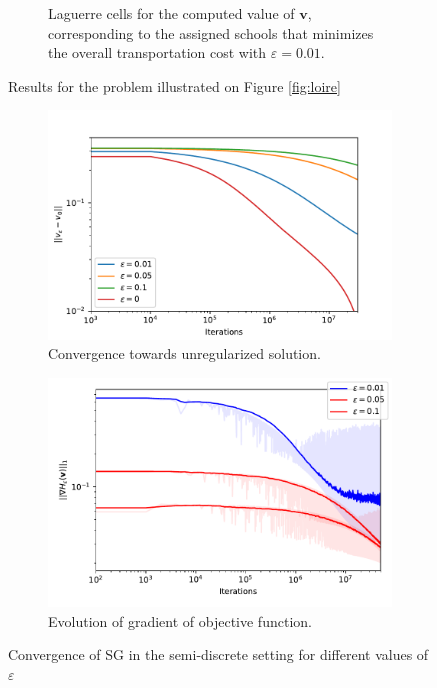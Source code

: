 \begin{figure}[h]
\begin{subfigure}{.49\linewidth}
        \caption{Laguerre cells for the computed value of $\bm{v}$, corresponding to the assigned schools that minimizes the overall transportation cost with $\varepsilon = 0.01$.}
        \label{fig:loire-cells}
    \end{subfigure}
    \caption{Results for the problem illustrated on Figure \ref{fig:loire}}
\end{figure}


\begin{figure}[h]
    \centering
    \begin{subfigure}{.49\linewidth}
        \centering
        \includegraphics[width=\linewidth]{figures/semi_discrete_eps.pdf}
        \caption{Convergence towards unregularized solution.}
        \label{fig:eps-conv-semi-dis}
    \end{subfigure}
    \begin{subfigure}{.49\linewidth}
        \centering
        \includegraphics[width=\linewidth]{figures/grad_semi_discrete.pdf}
        \caption{Evolution of gradient of objective function.}
        \label{fig:eps-grad-semi-dis}
    \end{subfigure}
    \caption{Convergence of SG in the semi-discrete setting for different values of $\varepsilon$}
\end{figure}

